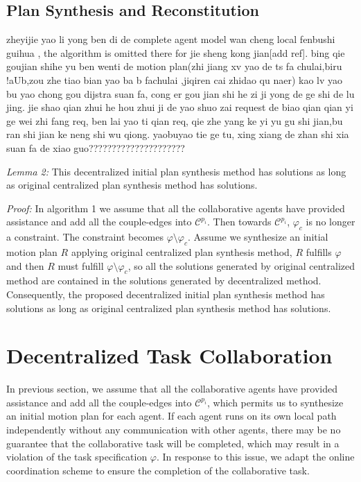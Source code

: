 \documentclass[journal]{IEEEtran}
\begin{document}
\subsection{Plan Synthesis and Reconstitution}
zheyijie yao li yong ben di de complete agent model wan cheng local fenbushi guihua , the algorithm is omitted there for jie sheng kong jian[add ref]. bing qie goujian shihe yu ben wenti de motion plan(zhi jiang xv yao de ts fa chulai,biru !aUb,zou zhe tiao bian yao ba b fachulai ,jiqiren cai zhidao qu naer) kao lv yao bu yao chong gou dijstra suan fa, cong er gou jian shi he zi ji yong de ge shi de lu jing.
jie shao qian zhui he hou zhui
ji de yao shuo zai request de biao qian qian yi ge wei zhi fang req, ben lai yao ti qian req, qie zhe yang ke yi yu gu shi jian,bu ran shi jian ke neng shi wu qiong.
yaobuyao tie ge tu, xing xiang de zhan shi xia suan fa de xiao guo?????????????????????\par
\emph{Lemma 2:} This decentralized initial plan synthesis method has solutions as long as original centralized plan synthesis method has solutions.\par
\emph{Proof:} In algorithm 1 we assume that all the collaborative agents have provided assistance and add all the couple-edges into $\mathcal{C}^{p_i}$. Then towards $\mathcal{C}^{p_i}$, $\varphi_c$ is no longer a constraint. The constraint becomes $\varphi \setminus \varphi_c$. Assume we synthesize an initial motion plan $R$ applying original centralized plan synthesis method, $R$ fulfills $\varphi$ and then $R$ must fulfill $\varphi \setminus \varphi_c$, so all the solutions generated by original centralized method are contained in the solutions generated by decentralized method. Consequently, the proposed decentralized initial plan synthesis method has solutions as long as original centralized plan synthesis method has solutions.
\section{Decentralized Task Collaboration}
In previous section, we assume that all the collaborative agents have provided assistance and add all the couple-edges into $\mathcal{C}^{p_i}$, which permits us to synthesize an initial motion plan for each agent. If each agent runs on its own local path independently without any communication with other agents, there may be no guarantee that the collaborative task will be completed, which may result in a violation of the task specification $\varphi$. In response to this issue, we adapt the online coordination scheme to ensure the completion of the collaborative task.
\end{document}
